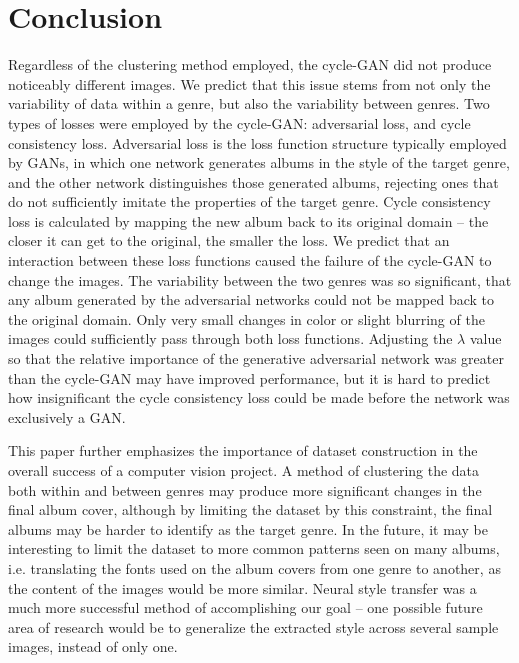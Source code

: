 \documentclass{article}
\begin{document}
\section{Conclusion}

Regardless of the clustering method employed, the cycle-GAN did not produce noticeably different images. We predict that this issue stems from not only the variability of data within a genre, but also the variability between genres. Two types of losses were employed by the cycle-GAN: adversarial loss, and cycle consistency loss. Adversarial loss is the loss function structure typically employed by GANs, in which one network generates albums in the style of the target genre, and the other network distinguishes those generated albums, rejecting ones that do not sufficiently imitate the properties of the target genre. Cycle consistency loss is calculated by mapping the new album back to its original domain – the closer it can get to the original, the smaller the loss. We predict that an interaction between these loss functions caused the failure of the cycle-GAN to change the images. The variability between the two genres was so significant, that any album generated by the adversarial networks could not be mapped back to the original domain. Only very small changes in color or slight blurring of the images could sufficiently pass through both loss functions. Adjusting the $\lambda$ value so that the relative importance of the generative adversarial network was greater than the cycle-GAN may have improved performance, but it is hard to predict how insignificant the cycle consistency loss could be made before the network was exclusively a GAN.

\par This paper further emphasizes the importance of dataset construction in the overall success of a computer vision project. A method of clustering the data both within and between genres may produce more significant changes in the final album cover, although by limiting the dataset by this constraint, the final albums may be harder to identify as the target genre. In the future, it may be interesting to limit the dataset to more common patterns seen on many albums, i.e. translating the fonts used on the album covers from one genre to another, as the content of the images would be more similar. Neural style transfer was a much more successful method of accomplishing our goal – one possible future area of research would be to generalize the extracted style across several sample images, instead of only one.
\end{document}
